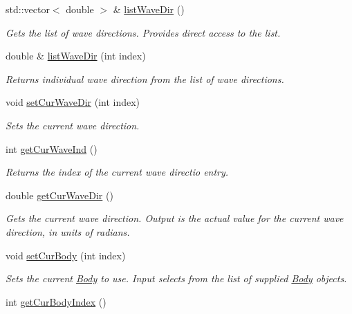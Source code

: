 \begin{DoxyCompactItemize}
std\-::vector$<$ double $>$ \& \hyperlink{classosea_1_1ofreq_1_1_outputs_body_a710a66d19fb8ba5a6c9c15e0143f832e}{list\-Wave\-Dir} ()
\begin{DoxyCompactList}\small\item\em Gets the list of wave directions. Provides direct access to the list. \end{DoxyCompactList}\item 
double \& \hyperlink{classosea_1_1ofreq_1_1_outputs_body_abc0b04ccd535145e9c9528cde8cd4d15}{list\-Wave\-Dir} (int index)
\begin{DoxyCompactList}\small\item\em Returns individual wave direction from the list of wave directions. \end{DoxyCompactList}\item 
void \hyperlink{classosea_1_1ofreq_1_1_outputs_body_a7d2b93ecaf1fa39257444bdf3194eacc}{set\-Cur\-Wave\-Dir} (int index)
\begin{DoxyCompactList}\small\item\em Sets the current wave direction. \end{DoxyCompactList}\item 
int \hyperlink{classosea_1_1ofreq_1_1_outputs_body_acac6b220f8d472d3cc7e9102022c88ff}{get\-Cur\-Wave\-Ind} ()
\begin{DoxyCompactList}\small\item\em Returns the index of the current wave directio entry. \end{DoxyCompactList}\item 
double \hyperlink{classosea_1_1ofreq_1_1_outputs_body_a21deeef0aaace27fa376c6222bc8b0a4}{get\-Cur\-Wave\-Dir} ()
\begin{DoxyCompactList}\small\item\em Gets the current wave direction. Output is the actual value for the current wave direction, in units of radians. \end{DoxyCompactList}\item 
void \hyperlink{classosea_1_1ofreq_1_1_outputs_body_a4b33361c2888937d2aa450f3e6df200d}{set\-Cur\-Body} (int index)
\begin{DoxyCompactList}\small\item\em Sets the current \hyperlink{classosea_1_1ofreq_1_1_body}{Body} to use. Input selects from the list of supplied \hyperlink{classosea_1_1ofreq_1_1_body}{Body} objects. \end{DoxyCompactList}\item 
int \hyperlink{classosea_1_1ofreq_1_1_outputs_body_a7331d48ef7cee6bd23ac0ab487894d6c}{get\-Cur\-Body\-Index} ()

\end{DoxyCompactItemize}
